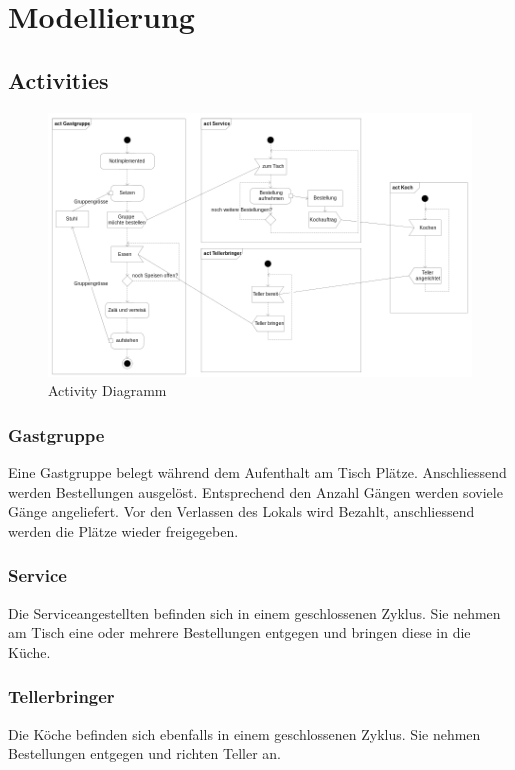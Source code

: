 \documentclass[ngerman,a4paper,12pt]{scrreprt}
\begin{document}
\chapter{Modellierung}
	\section{Activities}
		\begin{figure}[H]
			\centering
				\includegraphics[width=1\textwidth]{img/activityDiagramm-v1.png}
				\caption[Activity Diagramm]{Activity Diagramm}
				\label{activityDiagramm}
		\end{figure}
		
		\subsection{Gastgruppe}
		Eine Gastgruppe belegt während dem Aufenthalt am Tisch Plätze. Anschliessend werden Bestellungen ausgelöst.
		Entsprechend den Anzahl Gängen werden soviele Gänge angeliefert.
		Vor den Verlassen des Lokals wird Bezahlt, anschliessend werden die Plätze wieder freigegeben.
		
		\subsection{Service}
		Die Serviceangestellten befinden sich in einem geschlossenen Zyklus. Sie nehmen am Tisch eine oder mehrere Bestellungen entgegen und bringen diese in die Küche.
		
		\subsection{Tellerbringer}
		Die Köche befinden sich ebenfalls in einem geschlossenen Zyklus. Sie nehmen Bestellungen entgegen und richten Teller an.
		
\end{document}
